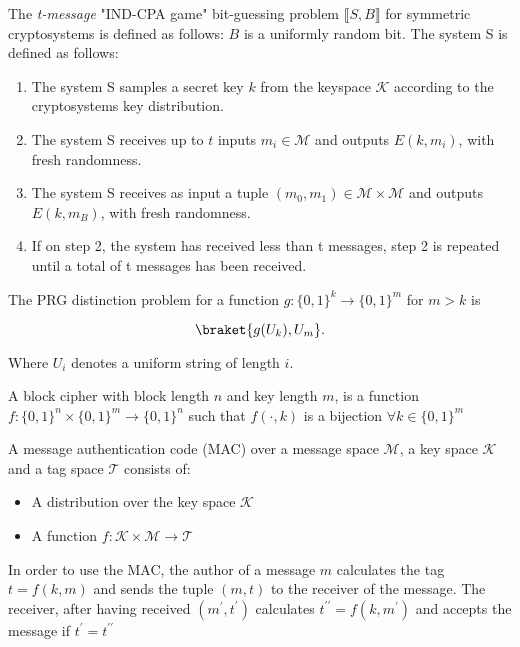 \documentclass[a4paper,german]{article}
\newenvironment{customdef}[1]{\renewcommand\theinnercustomdef{#1}\innercustomdef}{\endinnercustomdef}
\begin{document}
\begin{customdef}{3.2}
	The \emph{t-message} "IND-CPA game" bit-guessing problem $\llbracket S, B\rrbracket$ for symmetric cryptosystems is defined as follows: $B$ is a uniformly random bit. The system S is defined as follows:

	\begin{enumerate}

		\item  The system S samples a secret key $k$ from the keyspace $\mathcal{K}$ according to the cryptosystems key distribution.
		\item  The system S receives up to $t$ inputs $m_i \in \mathcal{M}$ and outputs $E(k, m_i)$, with fresh randomness.
		\item  The system S receives as input a tuple $(m_0, m_1) \in \mathcal{M} \times \mathcal{M}$ and outputs  $E(k, m_B)$, with fresh randomness.
		 \item If on step 2, the system has received less than t messages, step 2 is repeated until a total of t messages has been received.

	\end{enumerate}
\end{customdef}

\begin{customdef}{3.3}
	The PRG distinction problem for a function $g: \{0, 1\}^k \rightarrow \{0, 1\}^m$ for $m > k$ is

	\[
		\braket{g(U_k), U_m}
	.\]

	Where $U_i$ denotes a uniform string of length $i$.
\end{customdef}

\begin{customdef}{3.5}
	A block cipher with block length $n$ and key length $m$, is a function $f: \{0,1\}^n \times \{0,1\}^m \rightarrow \{0,1\}^n$ such that $f(\cdot, k)$ is a bijection $\forall k \in \{0,1\}^m$
\end{customdef}

\begin{customdef}{3.6}
	A message authentication code (MAC) over a message space $\mathcal{M}$, a key space $\mathcal{K}$ and a tag space $\mathcal{T}$ consists of:

	\begin{itemize}

		\item  A distribution over the key space $\mathcal{K}$
		\item  A function $f: \mathcal{K} \times \mathcal{M} \rightarrow \mathcal{T}$
	\end{itemize}

In order to use the MAC, the author of a message $m$ calculates the tag $t = f(k,m)$ and sends the tuple $(m, t)$ to the receiver of the message. The receiver, after having received $(m^\prime, t^\prime)$ calculates $t^{\prime\prime} = f(k, m^\prime)$ and accepts the message if $t^\prime = t^{\prime\prime}$
\end{customdef}
\end{document}
